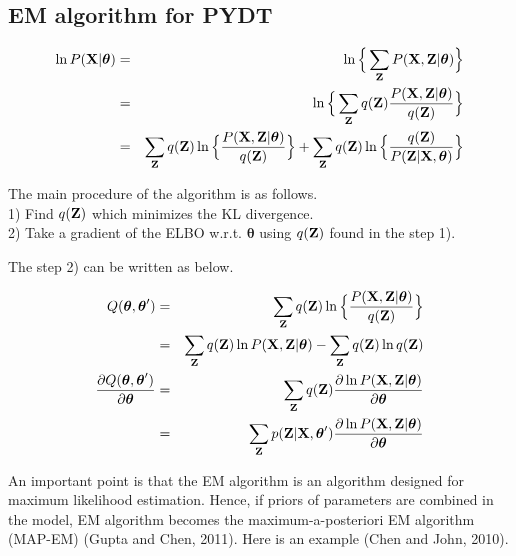 \documentclass{article}
\begin{document}
	\subsection{EM algorithm for PYDT}
	\begin{eqnarray}
		\ln P(\bold{X}|\boldsymbol{\theta}) &=& \ln \Big\{\sum_\bold{Z}P(\bold{X}, \bold{Z} | \boldsymbol{\theta}) \Big\} \nonumber \\
		&=& \ln \Big\{\sum_\bold{Z}q(\bold{Z})\frac{P(\bold{X}, \bold{Z}|\boldsymbol{\theta})}{q(\bold{Z})} \Big\} \nonumber \\
		&=& \sum_\bold{Z}q(\bold{Z})\ln \Big\{ \frac{P(\bold{X}, \bold{Z}| \boldsymbol{\theta})}{q(\bold{Z})} \Big\} + \sum_\bold{Z}q(\bold{Z})\ln \Big\{ \frac{q(\bold{Z})}{P(\bold{Z}|\bold{X}, \boldsymbol{\theta})} \Big\}
	\end{eqnarray}

The main procedure of the algorithm is as follows. \\
1) Find $q(\bold{Z})$ which minimizes the KL divergence. \\
2) Take a gradient of the ELBO w.r.t. $\boldsymbol{\theta}$ using $q(\bold{Z})$ found in the step 1).\par
The step 2) can be written as below.

	\begin{eqnarray}
	Q(\boldsymbol{\theta}, \boldsymbol{\theta}') &=& \sum_\bold{Z}q(\bold{Z})\ln \Big\{ \frac{P(\bold{X}, \bold{Z}| \boldsymbol{\theta})}{q(\bold{Z})} \Big\} \nonumber \\
	&=& \sum_\bold{Z}q(\bold{Z}) \ln P(\bold{X}, \bold{Z}| \boldsymbol{\theta}) - \sum_\bold{Z}q(\bold{Z})\ln q(\bold{Z})\\
	\frac{\partial Q(\boldsymbol{\theta}, \boldsymbol{\theta}')}{\partial \boldsymbol{\theta}} &=& \sum_\bold{Z} q(\bold{Z}) \frac{\partial \ln P(\bold{X}, \bold{Z}|\boldsymbol{\theta}) }{\partial \boldsymbol{\theta}} \nonumber \\
	&=& \sum_\bold{Z}p(\bold{Z}|\bold{X}, \boldsymbol{\theta}') \frac{\partial \ln P(\bold{X}, \bold{Z}|\boldsymbol{\theta}) }{\partial \boldsymbol{\theta}}
	\end{eqnarray}
	
	An important point is that the EM algorithm is an algorithm designed for maximum likelihood estimation. Hence, if priors of parameters are combined in the model, EM algorithm becomes the maximum-a-posteriori EM algorithm (MAP-EM) (Gupta and Chen, 2011). Here is an example (Chen and John, 2010).
	
\end{document}
